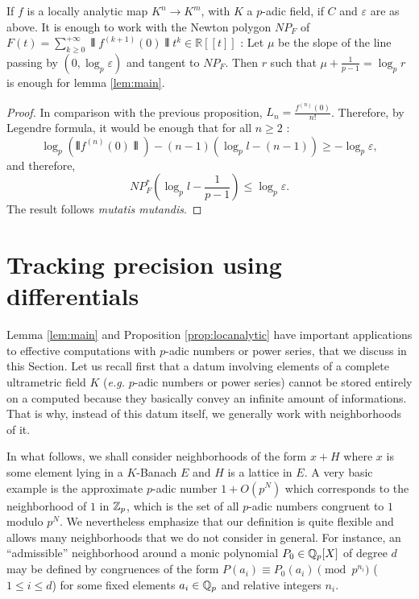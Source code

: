 \documentclass{lms}
\begin{document}
\begin{prop} \label{prop:locanalyticfinitedim}
If $f$ is a locally analytic map $K^n \rightarrow K^m$, with $K$ a $p$-adic field, if $C$ and $\varepsilon$ are as above. It is enough to work with the Newton polygon $NP_F$ of $F(t) = \sum_{k\geq 0}^{+\infty} \interleave f^{(k+1)}(0) \interleave  t^k \in \mathbb{R}[[t]]$ : Let $\mu$ be the slope of the line passing by $(0, \log_p \varepsilon)$ and tangent to $NP_F$.
Then $r$ such that $\mu+\frac{1}{p-1}=\log_p r$ is enough for lemma \ref{lem:main}. 
\end{prop}
\begin{proof}
In comparison with the previous proposition, $L_n=\frac{f^{(n)}(0)}{n!}$. Therefore, by Legendre formula, it would be enough that for all $n \geq 2$ :
\[\log_p (\interleave f^{(n)}(0) \interleave )-(n-1) (\log_p l-(n-1)) \geq - \log_p \varepsilon,\]
and therefore, \[ NP_F^* \left( \log_p l - \frac{1}{p-1} \right) \leq \log_p \varepsilon.\]
The result follows \textit{mutatis mutandis}.
\end{proof}

\section{Tracking precision using differentials}
\label{sec:tracking}

Lemma \ref{lem:main} and Proposition \ref{prop:locanalytic} have 
important applications to effective computations with $p$-adic numbers 
or power series, that we discuss in this Section. Let us recall first 
that a datum involving elements of a complete ultrametric field $K$ 
(\emph{e.g.} $p$-adic numbers or power series) cannot be stored entirely 
on a computed because they basically convey an infinite amount of 
informations. That is why, instead of this datum itself, we generally 
work with neighborhoods of it.

In what follows, we shall consider neighborhoods of the form $x + H$ 
where $x$ is some element lying in a $K$-Banach $E$ and $H$ is a lattice 
in $E$. A very basic example is the approximate $p$-adic number $1 + 
O(p^N)$ which corresponds to the neighborhood of $1$ in $\mathbb Z_p$, which is 
the set of all $p$-adic numbers congruent to $1$ modulo $p^N$. We 
nevertheless emphasize that our definition is quite flexible and allows 
many neighborhoods that we do not consider in general. For instance, an 
``admissible'' neighborhood around a monic polynomial $P_0 \in \mathbb Q_p[X]$ 
of degree $d$ may be defined by congruences of the form $P(a_i) \equiv 
P_0(a_i) \pmod {p^{n_i}}$ ($1 \leq i \leq d$) for some fixed elements 
$a_i \in \mathbb Q_p$ and relative integers $n_i$.
\end{document}
